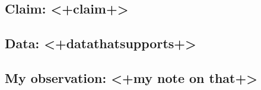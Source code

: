 \documentclass{report}
\begin{document}

\subsection{Claim: <+claim+>}

\subsection{Data: <+datathatsupports+>}

\subsection{My observation: <+my note on that+>}

\printbibliography
\end{document}
